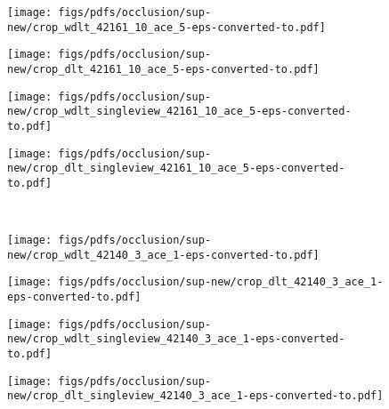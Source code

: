 \documentclass[runningheads]{llncs}
\begin{document}
 \begin{figure*}
	\centering
	
	\begin{subfigure}[b]{0.23\linewidth}        \centering
		\texttt{[image: figs/pdfs/occlusion/sup-new/crop\_wdlt\_42161\_10\_ace\_5-eps-converted-to.pdf]}
	\end{subfigure}
	\begin{subfigure}[b]{0.23\linewidth}        \centering
		\texttt{[image: figs/pdfs/occlusion/sup-new/crop\_dlt\_42161\_10\_ace\_5-eps-converted-to.pdf]}
	\end{subfigure}
	\begin{subfigure}[b]{0.23\linewidth}        \centering
		\texttt{[image: figs/pdfs/occlusion/sup-new/crop\_wdlt\_singleview\_42161\_10\_ace\_5-eps-converted-to.pdf]}
	\end{subfigure}
	\begin{subfigure}[b]{0.23\linewidth}        \centering
		\texttt{[image: figs/pdfs/occlusion/sup-new/crop\_dlt\_singleview\_42161\_10\_ace\_5-eps-converted-to.pdf]}
	\end{subfigure} \\   \vspace{1mm}
	
	
	\begin{subfigure}[b]{0.23\linewidth}        \centering
		\texttt{[image: figs/pdfs/occlusion/sup-new/crop\_wdlt\_42140\_3\_ace\_1-eps-converted-to.pdf]}
	\end{subfigure}
	\begin{subfigure}[b]{0.23\linewidth}        \centering
		\texttt{[image: figs/pdfs/occlusion/sup-new/crop\_dlt\_42140\_3\_ace\_1-eps-converted-to.pdf]}
	\end{subfigure}
	\begin{subfigure}[b]{0.23\linewidth}        \centering
		\texttt{[image: figs/pdfs/occlusion/sup-new/crop\_wdlt\_singleview\_42140\_3\_ace\_1-eps-converted-to.pdf]}
	\end{subfigure}
	\begin{subfigure}[b]{0.23\linewidth}        \centering
		\texttt{[image: figs/pdfs/occlusion/sup-new/crop\_dlt\_singleview\_42140\_3\_ace\_1-eps-converted-to.pdf]}
	\end{subfigure} \\ \vspace{1mm}
	

\end{figure*}
\end{document}
